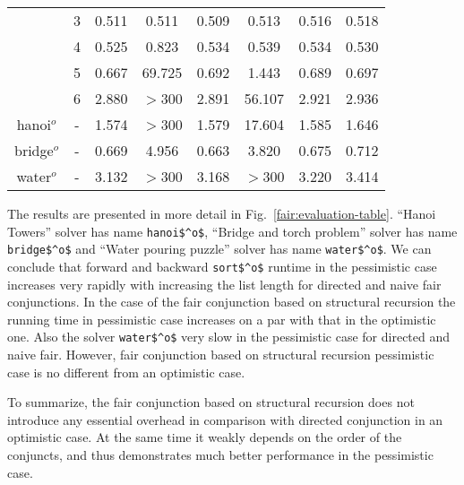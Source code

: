 \begin{figure*}
\begin{tabular}{ c | c | c | c | c | c | c | c }
                 & 3    & 0.511 &  0.511 & 0.509 & 0.513  & 0.516 & 0.518 \\
                 & 4    & 0.525 &  0.823 & 0.534 & 0.539  & 0.534 & 0.530 \\
                 & 5    & 0.667 & 69.725 & 0.692 & 1.443  & 0.689 & 0.697 \\
                 & 6    & 2.880 & $>$300 & 2.891 & 56.107 & 2.921 & 2.936 \\
    \hline
    hanoi$^o$    & -    & 1.574 & $>$300 & 1.579 & 17.604 & 1.585 & 1.646 \\
    \hline
    bridge$^o$   & -    & 0.669 & 4.956  & 0.663 & 3.820  & 0.675 & 0.712 \\
    \hline
    water$^o$    & -    & 3.132 & $>$300 & 3.168 & $>$300 & 3.220 & 3.414

  \end{tabular}
  \caption{The results of evaluation: running times of benchmarks in seconds}
  \label{fair:evaluation-table}
\end{figure*}

The results are presented in more detail in Fig.~\ref{fair:evaluation-table}. ``Hanoi Towers'' solver has name \lstinline{hanoi$^o$}, ``Bridge and torch problem'' solver has name \lstinline{bridge$^o$} and ``Water pouring puzzle'' solver has name \lstinline{water$^o$}. We can conclude that forward and backward \lstinline{sort$^o$} runtime in the pessimistic case increases very rapidly with increasing the list length for directed and naive fair conjunctions. In the case of the fair conjunction based on structural recursion the running time in pessimistic case increases on a par with that in the optimistic one. Also  the solver \lstinline{water$^o$} very slow in the pessimistic case for directed and naive fair. However, fair conjunction based on structural recursion pessimistic case is no different from an optimistic case.


To summarize, the fair conjunction based on structural recursion does not introduce any essential overhead in comparison with directed conjunction in an optimistic case. At the same time it
weakly depends on the order of the conjuncts, and thus demonstrates much better performance in the pessimistic case.
